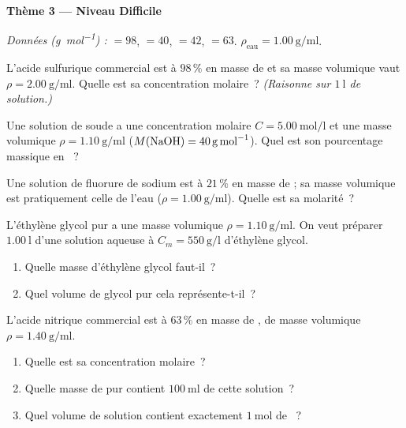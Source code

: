 \documentclass[11pt,a4paper]{article}
\begin{document}
\begin{center}{\large\bfseries\color{primarydark} Thème 3 — Niveau Difficile}\end{center}
\emph{Données (\si{\gram\per\mole}) :} $=98$, $=40$, $=42$,
$=63$. \quad $\rho_{\text{eau}} = \SI{1.00}{\gram\per\milli\litre}$.

\begin{exo}
L'acide sulfurique commercial est à $98\,\%$ en masse de  et sa masse volumique vaut
$\rho = \SI{2.00}{\gram\per\milli\litre}$. Quelle est sa concentration molaire~?
\emph{(Raisonne sur $\SI{1}{\litre}$ de solution.)}
\end{exo}

\begin{exo}
Une solution de soude a une concentration molaire $C = \SI{5.00}{\mole\per\litre}$ et une masse
volumique $\rho = \SI{1.10}{\gram\per\milli\litre}$ ($M(\ce{NaOH}) = \SI{40}{\gram\per\mole}$).
Quel est son pourcentage massique en ~?
\end{exo}

\begin{exo}
Une solution de fluorure de sodium est à $21\,\%$ en masse de  ; sa masse volumique est
pratiquement celle de l'eau ($\rho = \SI{1.00}{\gram\per\milli\litre}$). Quelle est sa molarité~?
\end{exo}

\begin{exo}
L'éthylène glycol pur a une masse volumique $\rho = \SI{1.10}{\gram\per\milli\litre}$. On veut
préparer $\SI{1.00}{\litre}$ d'une solution aqueuse à $C_m = \SI{550}{\gram\per\litre}$ d'éthylène
glycol.
\begin{enumerate}[label=\alph*)]
  \item Quelle masse d'éthylène glycol faut-il~?
  \item Quel volume de glycol pur cela représente-t-il~?
\end{enumerate}
\end{exo}

\begin{exo}
L'acide nitrique commercial est à $63\,\%$ en masse de , de masse volumique
$\rho = \SI{1.40}{\gram\per\milli\litre}$.
\begin{enumerate}[label=\alph*)]
  \item Quelle est sa concentration molaire~?
  \item Quelle masse de  pur contient $\SI{100}{\milli\litre}$ de cette solution~?
  \item Quel volume de solution contient exactement $\SI{1}{\mole}$ de ~?
\end{enumerate}
\end{exo}
\end{document}
